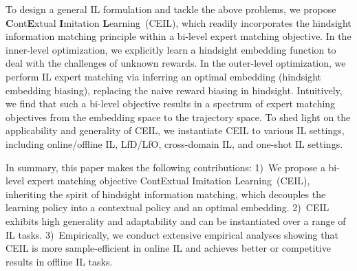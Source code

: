 To design a general IL formulation and tackle the above problems, we propose \textbf{C}ont\textbf{E}xtual \textbf{I}mitation \textbf{L}earning~(CEIL), which readily incorporates the hindsight information matching principle within a bi-level expert matching objective. 
In the inner-level optimization, we explicitly learn a hindsight embedding function to deal with the challenges of unknown rewards. 
In the outer-level optimization, we perform IL expert matching via inferring an optimal embedding (\ie hindsight embedding biasing), replacing the naive reward biasing in hindsight. 
Intuitively, we find that such a bi-level objective results in a spectrum of expert matching objectives from the embedding space to the trajectory space. 
To shed light on the applicability and generality of CEIL, we instantiate CEIL to various IL settings, including online/offline IL, LfD/LfO, cross-domain IL, and one-shot IL settings. 

In summary, this paper makes the following contributions: 
1)~We propose a bi-level expert matching objective ContExtual Imitation Learning~(CEIL), inheriting the spirit of hindsight information matching, which decouples the learning policy into a contextual policy and an optimal embedding.  
2)~CEIL exhibits high generality and adaptability and can be instantiated over a range of IL tasks. 
3)~Empirically, we conduct extensive empirical analyses showing that CEIL is more sample-efficient in online IL and achieves better or competitive results in offline IL tasks. 









